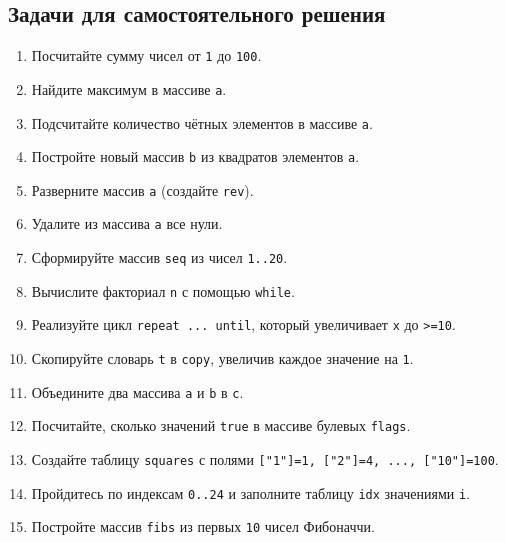 \subsection*{Задачи для самостоятельного решения}
\begin{enumerate}
  \item Посчитайте сумму чисел от \verb|1| до \verb|100|.
  \item Найдите максимум в массиве \verb|a|.
  \item Подсчитайте количество чётных элементов в массиве \verb|a|.
  \item Постройте новый массив \verb|b| из квадратов элементов \verb|a|.
  \item Разверните массив \verb|a| (создайте \verb|rev|).
  \item Удалите из массива \verb|a| все нули.
  \item Сформируйте массив \verb|seq| из чисел \verb|1..20|.
  \item Вычислите факториал \verb|n| с помощью \verb|while|.
  \item Реализуйте цикл \verb|repeat ... until|, который увеличивает \verb|x| до \verb|>=10|.
  \item Скопируйте словарь \verb|t| в \verb|copy|, увеличив каждое значение на \verb|1|.
  \item Объедините два массива \verb|a| и \verb|b| в \verb|c|.
  \item Посчитайте, сколько значений \verb|true| в массиве булевых \verb|flags|.
  \item Создайте таблицу \verb|squares| с полями \verb|["1"]=1, ["2"]=4, ..., ["10"]=100|.
  \item Пройдитесь по индексам \verb|0..24| и заполните таблицу \verb|idx| значениями \verb|i|.
  \item Постройте массив \verb|fibs| из первых \verb|10| чисел Фибоначчи.
\end{enumerate}
